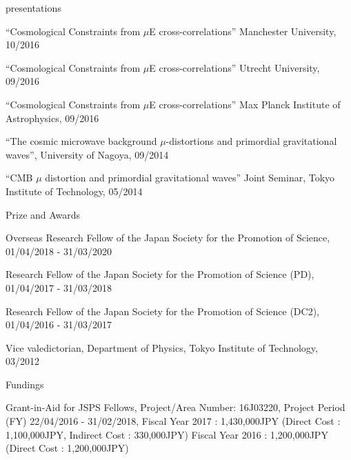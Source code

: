 \documentclass[a4paper]{resume} %
\begin{document}
\begin{rSection}{presentations}
\begin{etaremune}
    \item
    ``Cosmological Constraints from $\mu$E cross-correlations'' Manchester University, 10/2016 

    \item
    ``Cosmological Constraints from $\mu$E cross-correlations'' Utrecht University, 09/2016 

    \item
``Cosmological Constraints from $\mu$E cross-correlations'' Max Planck Institute of Astrophysics, 09/2016 

    \item
``The cosmic microwave background $\mu$-distortions and primordial gravitational waves'', University of Nagoya, 09/2014 

    \item 
    ``CMB $\mu$ distortion and primordial gravitational waves'' Joint Seminar, Tokyo Institute of Technology, 05/2014
\end{etaremune}

\end{rSection}


\begin{rSection}{Prize and Awards}
	\begin{etaremune}

\item Overseas Research Fellow of the Japan Society for the Promotion of Science, 01/04/2018 - 31/03/2020

    \item Research Fellow of the Japan Society for the Promotion of Science (PD), 01/04/2017 - 31/03/2018

    \item Research Fellow of the Japan Society for the Promotion of Science (DC2), 01/04/2016 - 31/03/2017

    \item
Vice valedictorian, Department of Physics, Tokyo Institute of Technology, 03/2012
    
\end{etaremune}
\end{rSection}

\begin{rSection}{Fundings}
\begin{etaremune}
    \item
Grant-in-Aid for JSPS Fellows, Project/Area Number: 16J03220, Project Period (FY)    22/04/2016 - 31/02/2018,
Fiscal Year 2017 : 1,430,000JPY (Direct Cost : 1,100,000JPY, Indirect Cost : 330,000JPY)
Fiscal Year 2016 : 1,200,000JPY (Direct Cost : 1,200,000JPY)

\end{etaremune}
\end{rSection}
\end{document}
